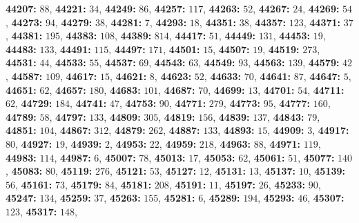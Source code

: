 \textsf{\bfseries 44207:} $88$, \textsf{\bfseries 44221:} $34$, \textsf{\bfseries 44249:} $86$, \textsf{\bfseries 44257:} $117$, \textsf{\bfseries 44263:} $52$, \textsf{\bfseries 44267:} $24$, \textsf{\bfseries 44269:} $54$, \textsf{\bfseries 44273:} $94$, \textsf{\bfseries 44279:} $38$, \textsf{\bfseries 44281:} $7$, \textsf{\bfseries 44293:} $18$, \textsf{\bfseries 44351:} $38$, \textsf{\bfseries 44357:} $123$, \textsf{\bfseries 44371:} $37$, \textsf{\bfseries 44381:} $195$, \textsf{\bfseries 44383:} $108$, \textsf{\bfseries 44389:} $814$, \textsf{\bfseries 44417:} $51$, \textsf{\bfseries 44449:} $131$, \textsf{\bfseries 44453:} $19$, \textsf{\bfseries 44483:} $133$, \textsf{\bfseries 44491:} $115$, \textsf{\bfseries 44497:} $171$, \textsf{\bfseries 44501:} $15$, \textsf{\bfseries 44507:} $19$, \textsf{\bfseries 44519:} $273$, \textsf{\bfseries 44531:} $44$, \textsf{\bfseries 44533:} $55$, \textsf{\bfseries 44537:} $69$, \textsf{\bfseries 44543:} $63$, \textsf{\bfseries 44549:} $93$, \textsf{\bfseries 44563:} $139$, \textsf{\bfseries 44579:} $42$, \textsf{\bfseries 44587:} $109$, \textsf{\bfseries 44617:} $15$, \textsf{\bfseries 44621:} $8$, \textsf{\bfseries 44623:} $52$, \textsf{\bfseries 44633:} $70$, \textsf{\bfseries 44641:} $87$, \textsf{\bfseries 44647:} $5$, \textsf{\bfseries 44651:} $62$, \textsf{\bfseries 44657:} $180$, \textsf{\bfseries 44683:} $101$, \textsf{\bfseries 44687:} $70$, \textsf{\bfseries 44699:} $13$, \textsf{\bfseries 44701:} $54$, \textsf{\bfseries 44711:} $62$, \textsf{\bfseries 44729:} $184$, \textsf{\bfseries 44741:} $47$, \textsf{\bfseries 44753:} $90$, \textsf{\bfseries 44771:} $279$, \textsf{\bfseries 44773:} $95$, \textsf{\bfseries 44777:} $160$, \textsf{\bfseries 44789:} $58$, \textsf{\bfseries 44797:} $133$, \textsf{\bfseries 44809:} $305$, \textsf{\bfseries 44819:} $156$, \textsf{\bfseries 44839:} $137$, \textsf{\bfseries 44843:} $79$, \textsf{\bfseries 44851:} $104$, \textsf{\bfseries 44867:} $312$, \textsf{\bfseries 44879:} $262$, \textsf{\bfseries 44887:} $133$, \textsf{\bfseries 44893:} $15$, \textsf{\bfseries 44909:} $3$, \textsf{\bfseries 44917:} $80$, \textsf{\bfseries 44927:} $19$, \textsf{\bfseries 44939:} $2$, \textsf{\bfseries 44953:} $22$, \textsf{\bfseries 44959:} $218$, \textsf{\bfseries 44963:} $88$, \textsf{\bfseries 44971:} $119$, \textsf{\bfseries 44983:} $114$, \textsf{\bfseries 44987:} $6$, \textsf{\bfseries 45007:} $78$, \textsf{\bfseries 45013:} $17$, \textsf{\bfseries 45053:} $62$, \textsf{\bfseries 45061:} $51$, \textsf{\bfseries 45077:} $140$, \textsf{\bfseries 45083:} $80$, \textsf{\bfseries 45119:} $276$, \textsf{\bfseries 45121:} $53$, \textsf{\bfseries 45127:} $12$, \textsf{\bfseries 45131:} $13$, \textsf{\bfseries 45137:} $10$, \textsf{\bfseries 45139:} $56$, \textsf{\bfseries 45161:} $73$, \textsf{\bfseries 45179:} $84$, \textsf{\bfseries 45181:} $208$, \textsf{\bfseries 45191:} $11$, \textsf{\bfseries 45197:} $26$, \textsf{\bfseries 45233:} $90$, \textsf{\bfseries 45247:} $134$, \textsf{\bfseries 45259:} $37$, \textsf{\bfseries 45263:} $155$, \textsf{\bfseries 45281:} $6$, \textsf{\bfseries 45289:} $194$, \textsf{\bfseries 45293:} $46$, \textsf{\bfseries 45307:} $123$, \textsf{\bfseries 45317:} $148$, 
